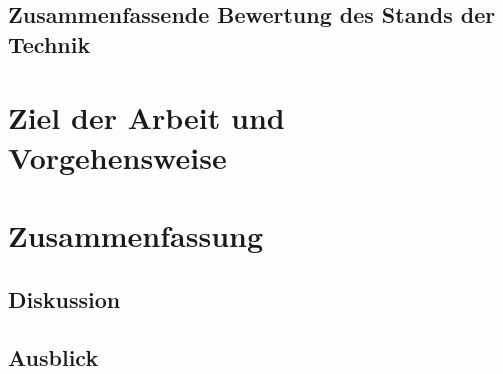 \documentclass[%
english, ngerman,%
]{iswipads/iswipads} %
\begin{document}
\section{Zusammenfassende Bewertung des Stands der Technik}

\chapter{Ziel der Arbeit und Vorgehensweise}



\chapter{Zusammenfassung}
\section{Diskussion}
\section{Ausblick}


\end{document}

